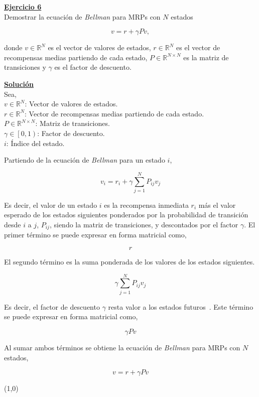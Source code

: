 \indent\underline{\textbf{Ejercicio 6}}\\
Demostrar la ecuación de \textit{Bellman} para MRPs con $N$ estados

\[
    v = r + \gamma Pv,
\]

donde $v \in \mathbb{R}^N$ es el vector de valores de estados, $r \in \mathbb{R}^N$ es el vector de recompensas medias partiendo de cada estado, $P \in \mathbb{R}^{N \times N} $ es la matriz de transiciones y $\gamma$ es el factor de descuento.

\indent\underline{\textbf{Solución}}\\
Sea,\\
$v \in \mathbb{R}^N$: Vector de valores de estados.\\
$r \in \mathbb{R}^N$: Vector de recompensas medias partiendo de cada estado.\\
$P \in \mathbb{R}^{N \times N}$: Matriz de transiciones.\\
$\gamma \in \left[0,1\right)$: Factor de descuento. \\
$i$: Índice del estado.

Partiendo de la ecuación de \textit{Bellman} para un estado $i$,

\[
    v_i = r_i + \gamma \sum_{j=1}^{N} P_{ij} v_j
\]

Es decir, el valor de un estado $i$ es la recompensa inmediata $r_i$ más el valor esperado de los estados siguientes ponderados por la probabilidad de transición desde $i$ a $j$, $P_{ij}$, siendo la matriz de transiciones, y descontados por el factor $\gamma$.
El primer término se puede expresar en forma matricial como,

\[
    r
\]

El segundo término es la suma ponderada de los valores de los estados siguientes.

\[
    \gamma \sum_{j=1}^{N} P_{ij} v_j
\]

Es decir, el factor de descuento $\gamma$ resta valor a los estados futuros~\cite{Sutton2018}.
Este término se puede expresar en forma matricial como,

\[
    \gamma Pv
\]

Al sumar ambos términos se obtiene la ecuación de \textit{Bellman} para MRPs con $N$ estados,

\[
    v = r + \gamma Pv
\]

\line(1,0){\textwidth}
